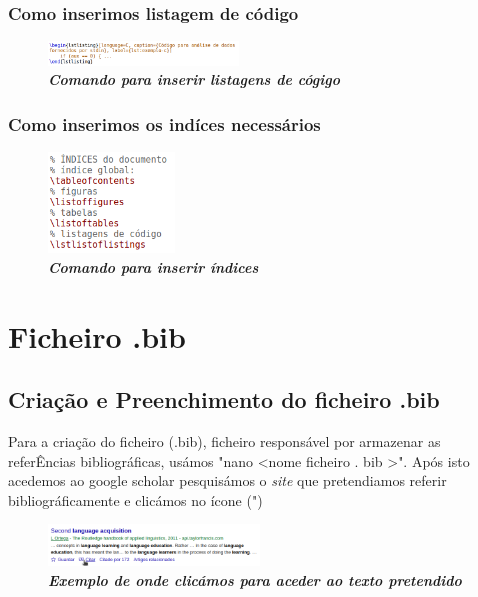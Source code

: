 \documentclass[a4wide]{report}
\begin{document}
{{{{\newpage

\subsection{Como inserimos listagem de código}
\Large

\begin{figure}[hbt]
    \centering
    \includegraphics[width=0.45\textwidth]{ima3.png}
    \caption{\textbf{\textit{Comando para inserir listagens de cógigo}} \label{fig:imagem}}
\end{figure}


\subsection{Como inserimos os indíces necessários}
\Large

\begin{figure}[hbt]
    \centering
    \includegraphics[width=0.30\textwidth]{ima4.png}
    \caption{\textbf{\textit{Comando para inserir índices}} \label{fig:imagem}}
\end{figure}

\chapter{Ficheiro .bib}
\section{Criação e Preenchimento do ficheiro .bib}
\Large
	Para a criação do ficheiro (.bib), ficheiro responsável por armazenar as referÊncias bibliográficas, usámos "nano <nome ficheiro . bib >".
	Após isto acedemos ao google scholar pesquisámos o \textit{site} que pretendiamos referir bibliográficamente e clicámos no ícone (")

\begin{figure}[hbt]
    \centering
    \includegraphics[width=0.50\textwidth]{exsite.png}
    \caption{\textbf{\textit{Exemplo de onde clicámos para aceder ao texto pretendido}} \label{fig:imagem}}
\end{figure}

}}}}
\end{document}
